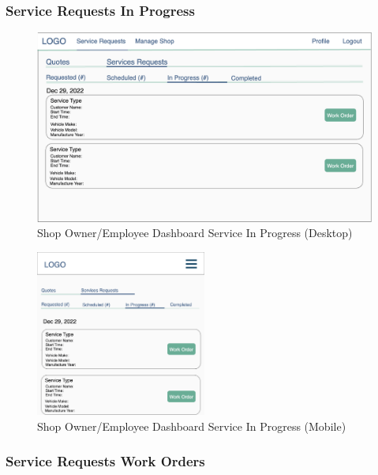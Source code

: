 \documentclass[12pt, titlepage]{article}
\begin{document}
\subsubsection{Service Requests \textemdash{} In Progress}

\begin{figure}[H]
	\centering
	\includegraphics[width=\textwidth]{mockups/Shop Owner Dashboard (Service Requests - In Progress) (Desktop).png}
	\caption{Shop Owner/Employee Dashboard \textemdash{} Service \textemdash{} In Progress (Desktop)}
\end{figure}

\begin{figure}[H]
	\centering
	\includegraphics[width=0.5\textwidth]{mockups/Shop Owner Dashboard (Service Requests - In Progress) (Mobile).png}
	\caption{Shop Owner/Employee Dashboard \textemdash{} Service \textemdash{} In Progress (Mobile)}
\end{figure}

\subsubsection{Service Requests \textemdash{} Work Orders}
\end{document}
